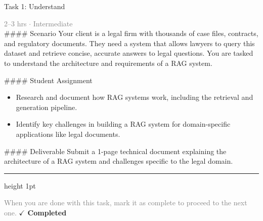 \documentclass[10pt,a4paper]{article}
\begin{document}
\begin{taskbox}{Task 1: Understand}

    {\small \textcolor{gray}{2--3 hrs $\cdot$ Intermediate}}\\[12pt]

    \#\#\#\# Scenario  
Your client is a legal firm with thousands of case files, contracts, and regulatory documents. They need a system that allows lawyers to query this dataset and retrieve concise, accurate answers to legal questions. You are tasked to understand the architecture and requirements of a RAG system.  

\#\#\#\# Student Assignment  
\begin{itemize}
    \item Research and document how RAG systems work, including the retrieval and generation pipeline.  
    \item Identify key challenges in building a RAG system for domain-specific applications like legal documents.  
\end{itemize}

\#\#\#\# Deliverable  
Submit a 1-page technical document explaining the architecture of a RAG system and challenges specific to the legal domain.\par

    \vspace{16pt}

    \textcolor{cardBorder}{\hrule height 1pt}\vspace{8pt}

    \small \textcolor{gray}{When you are done with this task, mark it as complete to proceed to the next one.} \hfill \textbf{\textcolor{brandDark}{$\checkmark$ Completed}}

\end{taskbox}
\end{document}
